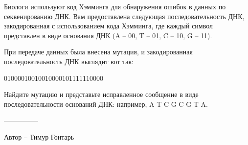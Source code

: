 \question
Биологи используют код Хэмминга для обнаружения ошибок в данных по секвенированию ДНК. Вам предоставлена следующая последовательность ДНК, закодированная с использованием кода Хэмминга, где каждый символ представлен в виде основания ДНК (A -- 00, T -- 01, C -- 10, G -- 11).

При передаче данных была внесена мутация, и закодированная последовательность ДНК выглядит вот так: 
\begin{center}
01000010010010000101111110000
\end{center}

Найдите мутацию и представьте исправленное сообщение в виде последовательности оснований ДНК: например, A T C G C G T A.

---------------

Автор -- Тимур Гонтарь